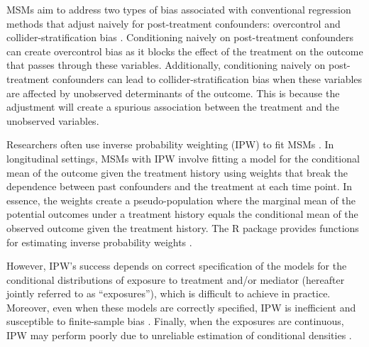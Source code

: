 MSMs aim to address two types of bias associated with conventional
regression methods that adjust naively for post-treatment confounders:
overcontrol and collider-stratification bias
\citetext{\citealp{robinsNewApproachCausal1986}; \citeyear{robinsMarginalStructuralModels2000a}}.
Conditioning naively on post-treatment confounders can create
overcontrol bias as it blocks the effect of the treatment on the outcome
that passes through these variables. Additionally, conditioning naively
on post-treatment confounders can lead to collider-stratification bias
when these variables are affected by unobserved determinants of the
outcome. This is because the adjustment will create a spurious
association between the treatment and the unobserved variables.

Researchers often use inverse probability weighting (IPW) to fit MSMs
\citep[for an in-depth exposition of the method,
see][]{robinsMarginalStructuralModels2000, robinsMarginalStructuralModels2000a, coleConstructingInverseProbability2008a}.
In longitudinal settings, MSMs with IPW involve fitting a model for the
conditional mean of the outcome given the treatment history using
weights that break the dependence between past confounders and the
treatment at each time point. In essence, the weights create a
pseudo-population where the marginal mean of the potential outcomes
under a treatment history equals the conditional mean of the observed
outcome given the treatment history. The R package 
provides functions for estimating inverse probability weights
\citep{vanderwalIpwPackageInverse2011, R-ipw}.

However, IPW's success depends on correct specification of the models
for the conditional distributions of exposure to treatment and/or
mediator (hereafter jointly referred to as ``exposures''), which is
difficult to achieve in practice. Moreover, even when these models are
correctly specified, IPW is inefficient and susceptible to finite-sample
bias
\citep{zhouResidualBalancingMethod2020a, wangDiagnosingBiasInverse2006}.
Finally, when the exposures are continuous, IPW may perform poorly due
to unreliable estimation of conditional densities
\citep{naimiConstructingInverseProbability2014, vansteelandtEstimatingDirectEffects2009}.

